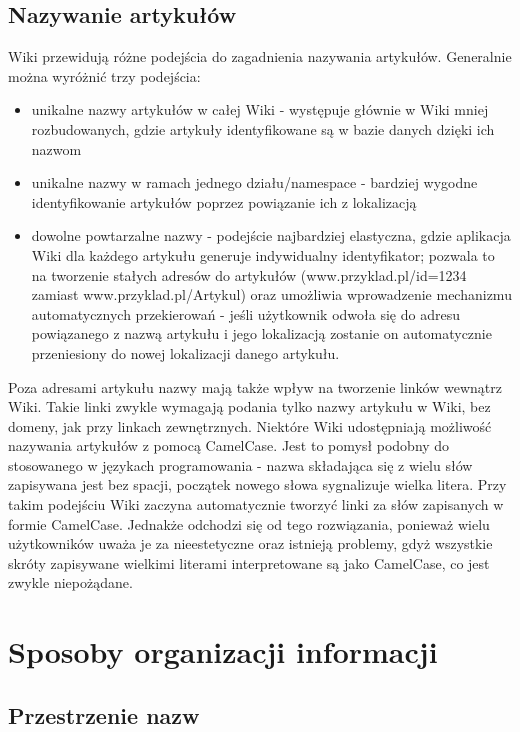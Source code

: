 \documentclass{article}
\begin{document}
	\subsection{Nazywanie artykułów}

Wiki przewidują różne podejścia do zagadnienia nazywania artykułów. Generalnie można wyróżnić trzy podejścia:
\begin{itemize}
\item unikalne nazwy artykułów w całej Wiki - występuje głównie w Wiki mniej rozbudowanych, gdzie artykuły identyfikowane są w bazie danych dzięki ich nazwom
\item unikalne nazwy w ramach jednego działu/namespace - bardziej wygodne identyfikowanie artykułów poprzez powiązanie ich z lokalizacją
\item dowolne powtarzalne nazwy - podejście najbardziej elastyczna, gdzie aplikacja Wiki dla każdego artykułu generuje indywidualny identyfikator; pozwala to na tworzenie stałych adresów do artykułów (www.przyklad.pl/id=1234 zamiast www.przyklad.pl/Artykul) oraz umożliwia wprowadzenie mechanizmu automatycznych przekierowań - jeśli użytkownik odwoła się do adresu powiązanego z nazwą artykułu i jego lokalizacją zostanie on automatycznie przeniesiony do nowej lokalizacji danego artykułu. 
\end{itemize}

Poza adresami artykułu nazwy mają także wpływ na tworzenie linków wewnątrz Wiki. Takie linki zwykle wymagają podania tylko nazwy artykułu w Wiki, bez domeny, jak przy linkach zewnętrznych. Niektóre Wiki udostępniają możliwość nazywania artykułów z pomocą CamelCase. Jest to pomysł podobny do stosowanego w językach programowania - nazwa składająca się z wielu słów zapisywana jest bez spacji, początek nowego słowa sygnalizuje wielka litera. Przy takim podejściu Wiki zaczyna automatycznie tworzyć linki za słów zapisanych w formie CamelCase. Jednakże odchodzi się od tego rozwiązania, ponieważ wielu użytkowników uważa je za nieestetyczne oraz istnieją problemy, gdyż wszystkie skróty zapisywane wielkimi literami interpretowane są jako CamelCase, co jest zwykle niepożądane.



\newpage
\section{Sposoby organizacji informacji}	
	\subsection{Przestrzenie nazw}
\end{document}
